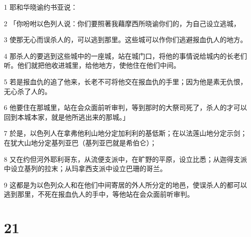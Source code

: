 \par 1 耶和华晓谕约书亚说：
\par 2 「你吩咐以色列人说：你们要照著我藉摩西所晓谕你们的，为自己设立逃城，
\par 3 使那无心而误杀人的，可以逃到那里。这些城可以作你们逃避报血仇人的地方。
\par 4 那杀人的要逃到这些城中的一座城，站在城门口，将他的事情说给城内的长老们听。他们就把他收进城里，给他地方，使他住在他们中间。
\par 5 若是报血仇的追了他来，长老不可将他交在报血仇的手里；因为他是素无仇恨，无心杀了人的。
\par 6 他要住在那城里，站在会众面前听审判，等到那时的大祭司死了，杀人的才可以回到本城本家，就是他所逃出来的那城。」
\par 7 於是，以色列人在拿弗他利山地分定加利利的基低斯；在以法莲山地分定示剑；在犹大山地分定基列亚巴（基列亚巴就是希伯仑）；
\par 8 又在约但河外耶利哥东，从流便支派中，在旷野的平原，设立比悉；从迦得支派中设立基列的拉末；从玛拿西支派中设立巴珊的哥兰。
\par 9 这都是为以色列众人和在他们中间寄居的外人所分定的地邑，使误杀人的都可以逃到那里，不死在报血仇人的手中，等他站在会众面前听审判。

\chapter{21}

